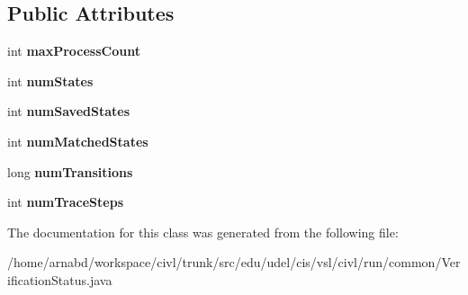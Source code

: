 \subsection*{Public Attributes}
\begin{DoxyCompactItemize}
\item 
\hypertarget{classedu_1_1udel_1_1cis_1_1vsl_1_1civl_1_1run_1_1common_1_1VerificationStatus_adca23f53d08c546c63d0e2d5c8af5bf5}{}int {\bfseries max\+Process\+Count}\label{classedu_1_1udel_1_1cis_1_1vsl_1_1civl_1_1run_1_1common_1_1VerificationStatus_adca23f53d08c546c63d0e2d5c8af5bf5}

\item 
\hypertarget{classedu_1_1udel_1_1cis_1_1vsl_1_1civl_1_1run_1_1common_1_1VerificationStatus_a91c95dfa96daa15a1a7b7905f9ba0339}{}int {\bfseries num\+States}\label{classedu_1_1udel_1_1cis_1_1vsl_1_1civl_1_1run_1_1common_1_1VerificationStatus_a91c95dfa96daa15a1a7b7905f9ba0339}

\item 
\hypertarget{classedu_1_1udel_1_1cis_1_1vsl_1_1civl_1_1run_1_1common_1_1VerificationStatus_ad54decdba2b466f842c5dc023876c022}{}int {\bfseries num\+Saved\+States}\label{classedu_1_1udel_1_1cis_1_1vsl_1_1civl_1_1run_1_1common_1_1VerificationStatus_ad54decdba2b466f842c5dc023876c022}

\item 
\hypertarget{classedu_1_1udel_1_1cis_1_1vsl_1_1civl_1_1run_1_1common_1_1VerificationStatus_a81395c50d01a40d57182cbd96b4cbe18}{}int {\bfseries num\+Matched\+States}\label{classedu_1_1udel_1_1cis_1_1vsl_1_1civl_1_1run_1_1common_1_1VerificationStatus_a81395c50d01a40d57182cbd96b4cbe18}

\item 
\hypertarget{classedu_1_1udel_1_1cis_1_1vsl_1_1civl_1_1run_1_1common_1_1VerificationStatus_a484b934eb8e55b869ab165b80ca99709}{}long {\bfseries num\+Transitions}\label{classedu_1_1udel_1_1cis_1_1vsl_1_1civl_1_1run_1_1common_1_1VerificationStatus_a484b934eb8e55b869ab165b80ca99709}

\item 
\hypertarget{classedu_1_1udel_1_1cis_1_1vsl_1_1civl_1_1run_1_1common_1_1VerificationStatus_a8464b8d72ebf8d1ed548a97bdd74efa8}{}int {\bfseries num\+Trace\+Steps}\label{classedu_1_1udel_1_1cis_1_1vsl_1_1civl_1_1run_1_1common_1_1VerificationStatus_a8464b8d72ebf8d1ed548a97bdd74efa8}

\end{DoxyCompactItemize}


The documentation for this class was generated from the following file\+:\begin{DoxyCompactItemize}
\item 
/home/arnabd/workspace/civl/trunk/src/edu/udel/cis/vsl/civl/run/common/Verification\+Status.\+java\end{DoxyCompactItemize}
